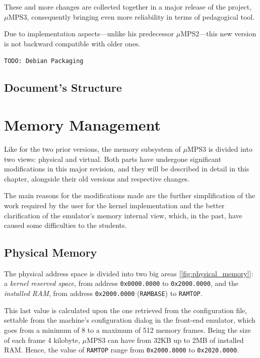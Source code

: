 \documentclass[12pt,a4paper,openright,twoside]{report}
\begin{document}
These and more changes are collected together in a major release of the project, $\mu$MPS3, consequently bringing even more reliability in terms of pedagogical tool.

Due to implementation aspects---unlike his predecessor $\mu$MPS2---this new version is not backward compatible with older ones.

\texttt{TODO: Debian Packaging}

\section{Document's Structure}

\chapter{Memory Management}
\lhead[\fancyplain{}{\bfseries\thepage}]{\fancyplain{}{\bfseries\rightmark}}
Like for the two prior versions, the memory subsystem of $\mu$MPS3 is divided into two views: physical and virtual.
Both parts have undergone significant modifications in this major revision, and they will be described in detail in this chapter, alongside their old versions and respective changes.

The main reasons for the modifications made are the further simplification of the work required by the user for the kernel implementation and the better clarification of the emulator's memory internal view, which, in the past, have caused some difficulties to the students.

\section{Physical Memory}
The physical address space is divided into two big areas [\autoref{fig:physical_memory}]: a \textit{kernel reserved space}, from address \texttt{0x0000.0000} to \texttt{0x2000.0000}, and the \textit{installed RAM}, from address \texttt{0x2000.0000} (\texttt{RAMBASE}) to \texttt{RAMTOP}.

This last value is calculated upon the one retrieved from the configuration file, settable from the machine's configuration dialog in the front-end emulator, which goes from a minimum of 8 to a maximum of 512 memory frames.
Being the size of each frame 4 kilobyte, $\mu$MPS3 can have from 32KB up to 2MB of installed RAM.
Hence, the value of \texttt{RAMTOP} range from \texttt{0x2000.8000} to \texttt{0x2020.0000}.
\end{document}
